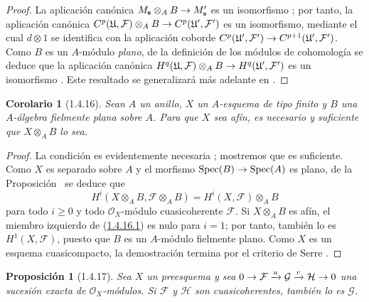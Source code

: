 \documentclass[10pt,oneside,openany]{book}
\makeatletter
\theoremstyle{egaenv}\newtheorem*{env}{---}
\theoremstyle{egastatement}
\newtheorem*{proposition}{Proposición}
\newtheorem*{corollary}{Corolario}
\theoremstyle{egadescription}
\newcommand{\EGAMaybeRefLink}[2]{\@ifundefined{r@#1}{#2}{\hyperref[#1]{#2}}}
\newcommand{\EGAUnavailableHyperref}[2]{\EGAMaybeRefLink{#1}{#2}}
\renewcommand{\geq}{\geqslant}
\renewcommand{\to}{\mathchoice{\longrightarrow}{\rightarrow}{\rightarrow}{\rightarrow}}
\makeatother
\begin{document}
\begin{proof}
La aplicación canónica $M_{\mathbf s}\otimes_A B\to M_{\mathbf s}'$ es un isomorfismo ; por tanto, la aplicación canónica $C^p(\mathfrak U,\mathcal F)\otimes_A B\to
C^p(\mathfrak U',\mathcal F')$ es un isomorfismo, mediante el cual $d\otimes1$ se identifica con la aplicación coborde $C^p(\mathfrak U',\mathcal F')\to C^{p+1}(\mathfrak U',\mathcal F')$.
Como $B$ es un $A$-módulo \emph{plano}, de la definición de los módulos de cohomología se deduce que la aplicación canónica $H^q(\mathfrak U,\mathcal F)\otimes_A B\to
H^q(\mathfrak U',\mathcal F')$ es un isomorfismo .
Este resultado se generalizará más adelante en \EGAUnavailableHyperref{section:III.6}{\textsection6}.
\end{proof}

\begin{corollary}[1.4.16]
\label{III.1.4.16}
\label{III.1.4.16-fr}
Sean $A$ un anillo, $X$ un $A$-esquema de tipo finito y $B$ una $A$-álgebra fielmente plana sobre $A$.
Para que $X$ sea afín, es necesario y suficiente que $X\otimes_A B$ lo sea.
\end{corollary}

\begin{proof}
La condición es evidentemente necesaria ; mostremos que es suficiente.
Como $X$ es separado sobre $A$ y el morfismo $\operatorname{Spec}(B)\to\operatorname{Spec}(A)$ es plano, de la Proposición~ se deduce que
\begin{equation}
\label{III.1.4.16.1-fr}
\tag{1.4.16.1}
H^i(X\otimes_A B,\mathcal F\otimes_A B)
=H^i(X,\mathcal F)\otimes_A B
\end{equation}
para todo $i\geq0$ y todo $\mathcal O_X$-módulo cuasicoherente $\mathcal F$.
Si $X\otimes_A B$ es afín, el miembro izquierdo de (\hyperref[III.1.4.16.1]{1.4.16.1}) es nulo para $i=1$; por tanto, también lo es $H^1(X,\mathcal F)$, puesto que $B$ es un $A$-módulo fielmente plano.
Como $X$ es un esquema cuasicompacto, la demostración termina por el criterio de Serre .
\end{proof}

\begin{proposition}[1.4.17]
\label{III.1.4.17}
\label{III.1.4.17-fr}
Sea $X$ un preesquema y sea $0\to\mathcal F\xrightarrow{u}\mathcal G\xrightarrow{v}\mathcal H\to0$ una sucesión exacta de $\mathcal O_X$-módulos.
Si $\mathcal F$ y $\mathcal H$ son cuasicoherentes, también lo es $\mathcal G$.
\end{proposition}
\end{document}
